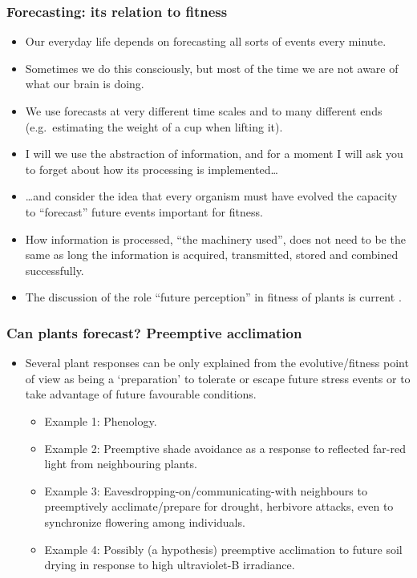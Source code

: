 \documentclass[10pt]{beamer}\usepackage[]{graphicx}\usepackage[]{color}
\begin{document}
\begin{frame}%
  \frametitle{Forecasting: its relation to fitness}
  \begin{itemize}
\item Our everyday life depends on forecasting all sorts of events every minute.
    \item Sometimes we do this consciously, but most of the time we are not aware of what our brain is doing.
    \item We use forecasts at very different time scales and to many different ends (e.g.\ estimating the weight of a cup when lifting it).
    \item I will we use the abstraction of information, and for a moment I will ask you to forget about how its processing is implemented\ldots
    \item \ldots and consider the idea that every organism must have evolved the capacity to ``forecast'' future events important for fitness.
    \item How information is processed, ``the machinery used'', does not need to be the same as long the information is acquired, transmitted, stored and combined successfully.
    \item The discussion of the role ``future perception'' in fitness of plants is current \autocite{Novoplansky2016a}.
  \end{itemize}
\end{frame}

\begin{frame}%
  \frametitle{Can plants forecast? Preemptive acclimation}
   \begin{itemize}
    \item Several plant responses can be only explained from the evolutive/fitness
    point of view as being a `preparation' to tolerate or escape future stress events or
    to take advantage of future favourable conditions.
    \begin{itemize}
    \item Example 1: Phenology.
    \item Example 2: Preemptive shade avoidance as a response to reflected far-red light from neighbouring
    plants.
    \item Example 3: Eavesdropping-on/communicating-with neighbours to preemptively acclimate/prepare
    for drought, herbivore attacks, even to synchronize flowering among individuals.
    \item Example 4: Possibly (a hypothesis) preemptive acclimation to future soil
    drying in response to high ultraviolet-B irradiance.
 \end{itemize}
  \end{itemize}
\end{frame}
\end{document}
